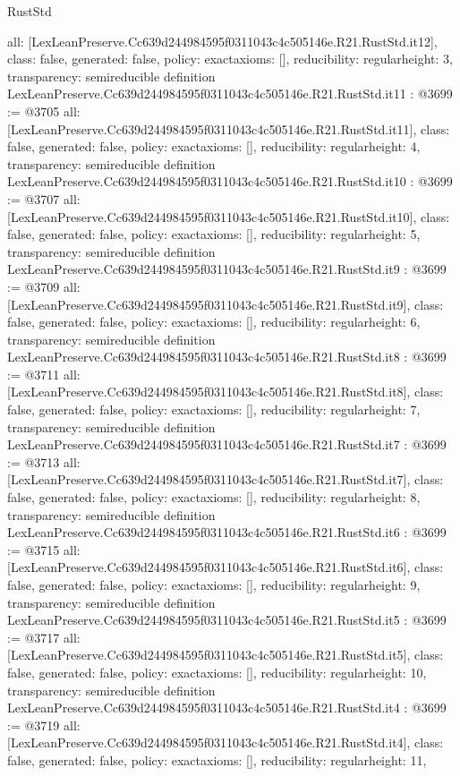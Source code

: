 \begin{lexlean}{RustStd}
\begin{coremodule}
{  all: [LexLeanPreserve.Cc639d244984595f0311043c4c505146e.R21.RustStd.it12],
  class: false,
  generated: false,
  policy: exact{axioms: []},
  reducibility: regular{height: 3},
  transparency: semireducible
}
definition LexLeanPreserve.Cc639d244984595f0311043c4c505146e.R21.RustStd.it11 : @3699 := @3705 {
  all: [LexLeanPreserve.Cc639d244984595f0311043c4c505146e.R21.RustStd.it11],
  class: false,
  generated: false,
  policy: exact{axioms: []},
  reducibility: regular{height: 4},
  transparency: semireducible
}
definition LexLeanPreserve.Cc639d244984595f0311043c4c505146e.R21.RustStd.it10 : @3699 := @3707 {
  all: [LexLeanPreserve.Cc639d244984595f0311043c4c505146e.R21.RustStd.it10],
  class: false,
  generated: false,
  policy: exact{axioms: []},
  reducibility: regular{height: 5},
  transparency: semireducible
}
definition LexLeanPreserve.Cc639d244984595f0311043c4c505146e.R21.RustStd.it9 : @3699 := @3709 {
  all: [LexLeanPreserve.Cc639d244984595f0311043c4c505146e.R21.RustStd.it9],
  class: false,
  generated: false,
  policy: exact{axioms: []},
  reducibility: regular{height: 6},
  transparency: semireducible
}
definition LexLeanPreserve.Cc639d244984595f0311043c4c505146e.R21.RustStd.it8 : @3699 := @3711 {
  all: [LexLeanPreserve.Cc639d244984595f0311043c4c505146e.R21.RustStd.it8],
  class: false,
  generated: false,
  policy: exact{axioms: []},
  reducibility: regular{height: 7},
  transparency: semireducible
}
definition LexLeanPreserve.Cc639d244984595f0311043c4c505146e.R21.RustStd.it7 : @3699 := @3713 {
  all: [LexLeanPreserve.Cc639d244984595f0311043c4c505146e.R21.RustStd.it7],
  class: false,
  generated: false,
  policy: exact{axioms: []},
  reducibility: regular{height: 8},
  transparency: semireducible
}
definition LexLeanPreserve.Cc639d244984595f0311043c4c505146e.R21.RustStd.it6 : @3699 := @3715 {
  all: [LexLeanPreserve.Cc639d244984595f0311043c4c505146e.R21.RustStd.it6],
  class: false,
  generated: false,
  policy: exact{axioms: []},
  reducibility: regular{height: 9},
  transparency: semireducible
}
definition LexLeanPreserve.Cc639d244984595f0311043c4c505146e.R21.RustStd.it5 : @3699 := @3717 {
  all: [LexLeanPreserve.Cc639d244984595f0311043c4c505146e.R21.RustStd.it5],
  class: false,
  generated: false,
  policy: exact{axioms: []},
  reducibility: regular{height: 10},
  transparency: semireducible
}
definition LexLeanPreserve.Cc639d244984595f0311043c4c505146e.R21.RustStd.it4 : @3699 := @3719 {
  all: [LexLeanPreserve.Cc639d244984595f0311043c4c505146e.R21.RustStd.it4],
  class: false,
  generated: false,
  policy: exact{axioms: []},
  reducibility: regular{height: 11},
}
\end{coremodule}
\end{lexlean}
